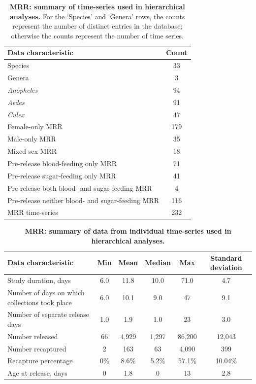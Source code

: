 \documentclass[12pt]{article}
\begin{document}
\begin{table}[htbp]
	\centering
	\begin{tabular}{lc}
		\toprule
		\textbf{Data characteristic} & \textbf{Count} \\
		\midrule
		Species & 33 \\
		Genera & 3 \\
		\textit{Anopheles} & 94 \\
		\textit{Aedes} & 91 \\
		\textit{Culex} & 47 \\
		Female-only MRR & 179 \\
		Male-only MRR & 35 \\
		Mixed sex MRR & 18 \\
		Pre-release blood-feeding only MRR & 71 \\
		Pre-release sugar-feeding only MRR & 41 \\
		Pre-release both blood- and sugar-feeding MRR & 4 \\
		Pre-release neither blood- and sugar-feeding MRR & 116 \\
		MRR time-series & 232 \\
		\bottomrule
	\end{tabular}%
	\caption{\textbf{MRR: summary of time-series used in hierarchical analyses.} For the `Species' and `Genera' rows, the counts represent the number of distinct entries in the database; otherwise the counts represent the number of time series.}
	\label{tab:mrr_aggregateData}%
\end{table}%

\begin{table}[htbp]
	\centering
	\footnotesize
	\begin{adjustwidth}{-0.5in}{-0.5in}%
		\begin{tabularx}{1.25\textwidth}{l|ccccc}
			\toprule
			\textbf{Data characteristic} & \textbf{Min} & \textbf{Mean} & \textbf{Median} & \textbf{Max} & \textbf{Standard deviation} \\
			\midrule
			Study duration, days & 6.0   & 11.8  & 10.0  & 71.0    & 4.7 \\
			Number of days on which collections took place & 6.0   & 10.1  & 9.0   & 47    & 9.1 \\
			Number of separate release days & 1.0     & 1.9   & 1.0     & 23    & 3.0 \\
			Number released & 66    & 4,929  & 1,297  & 86,200 & 12,043 \\
			Number recaptured & 2     & 163   & 63    & 4,090  & 399 \\
			Recapture percentage & 0\% & 8.6\% & 5.2\% & 57.1\% & 10.04\% \\
			Age at release, days & 0   & 1.8   & 0   & 13    & 2.8 \\
			\bottomrule
		\end{tabularx}%
		\caption{\textbf{MRR: summary of data from individual time-series used in hierarchical analyses.}}
		\label{tab:mrr_IndividualData}%
	\end{adjustwidth}
\end{table}%
\end{document}
